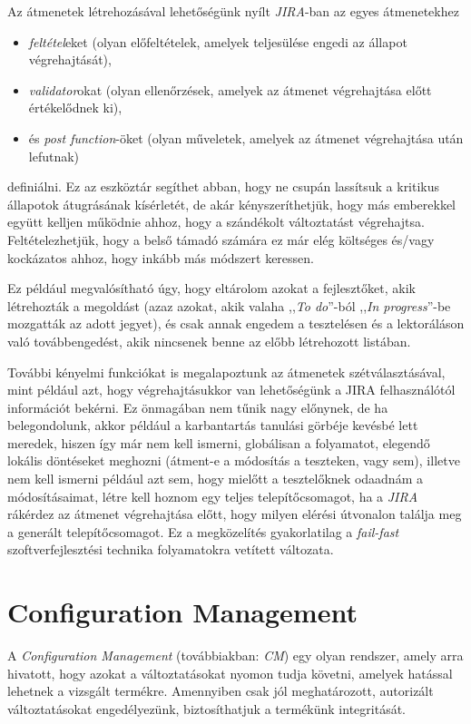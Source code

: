 \FloatBarrier

Az átmenetek létrehozásával lehetőségünk nyílt \emph{JIRA}-ban az egyes átmenetekhez
\begin{itemize}
    \item \emph{feltétel}eket (olyan előfeltételek, amelyek teljesülése engedi az állapot
        végrehajtását),
    \item \emph{validator}okat (olyan ellenőrzések, amelyek az átmenet végrehajtása előtt
        értékelődnek ki),
    \item és \emph{post function}-öket (olyan műveletek, amelyek az átmenet végrehajtása után
        lefutnak)
\end{itemize}
definiálni. Ez az eszköztár segíthet abban, hogy ne csupán lassítsuk a kritikus állapotok
átugrásának kísérletét, de akár kényszeríthetjük, hogy más emberekkel együtt kelljen működnie ahhoz,
hogy a szándékolt változtatást végrehajtsa. Feltételezhetjük, hogy a belső támadó számára ez már
elég költséges és/vagy kockázatos ahhoz, hogy inkább más módszert keressen.

Ez például megvalósítható úgy, hogy eltárolom azokat a fejlesztőket, akik létrehozták a megoldást
(azaz azokat, akik valaha ,,\emph{To do}''-ból ,,\emph{In progress}''-be mozgatták az adott jegyet),
és csak annak engedem a tesztelésen és a lektoráláson való továbbengedést, akik nincsenek benne az
előbb létrehozott listában.

További kényelmi funkciókat is megalapoztunk az átmenetek szétválasztásával, mint például azt, hogy
végrehajtásukkor van lehetőségünk a JIRA felhasználótól információt bekérni.  Ez önmagában nem tűnik
nagy előnynek, de ha belegondolunk, akkor például a karbantartás tanulási görbéje kevésbé lett
meredek, hiszen így már nem kell ismerni, globálisan a folyamatot, elegendő lokális döntéseket
meghozni (átment-e a módosítás a teszteken, vagy sem), illetve nem kell ismerni például azt sem,
hogy mielőtt a tesztelőknek odaadnám a módosításaimat, létre kell hoznom egy teljes
telepítőcsomagot, ha a \emph{JIRA} rákérdez az átmenet végrehajtása előtt, hogy milyen elérési
útvonalon találja meg a generált telepítőcsomagot. Ez a megközelítés gyakorlatilag
a \emph{fail-fast} \cite{shore2004fail} szoftverfejlesztési technika folyamatokra vetített
változata.

\pagebreak[3]
\section{Configuration Management}
A \emph{Configuration Management} (továbbiakban: \emph{CM}) egy olyan rendszer, amely arra hivatott,
hogy azokat a változtatásokat nyomon tudja követni, amelyek hatással lehetnek a vizsgált termékre.
Amennyiben csak jól meghatározott, autorizált változtatásokat engedélyezünk, biztosíthatjuk a
termékünk integritását.

